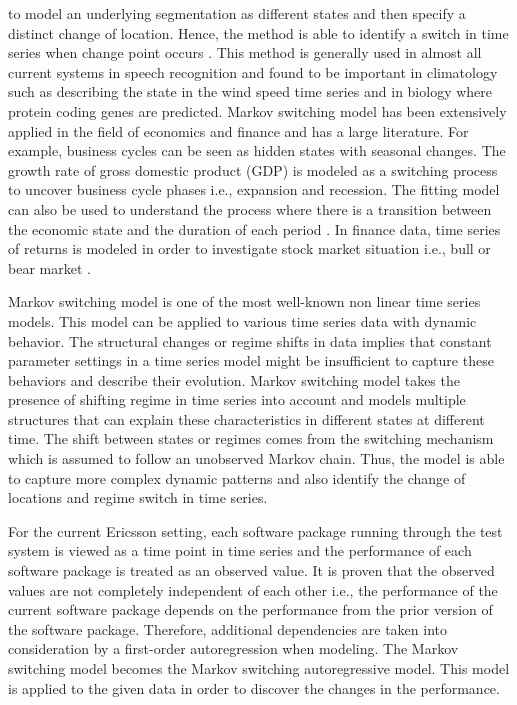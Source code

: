to model an underlying segmentation as different states and then specify
a distinct change of location. Hence, the method is able to identify
a switch in time series when change point occurs \citep{luong2012hidden}.
This method is generally used in almost all current systems in speech
recognition \citep{rabiner1989tutorial} and found to be important
in climatology such as describing the state in the wind speed time
series \citep{ailliot2012markov} and in biology \citep{stanke2003gene}
where protein coding genes are predicted. Markov switching model has
been extensively applied in the field of economics and finance and
has a large literature. For example, business cycles can be seen as
hidden states with seasonal changes. The growth rate of gross domestic
product (GDP) is modeled as a switching process to uncover business
cycle phases i.e., expansion and recession. The fitting model can
also be used to understand the process where there is a transition
between the economic state and the duration of each period \citep{hamilton1989new}.
In finance data, time series of returns is modeled in order to investigate
stock market situation i.e., bull or bear market \citep{kim1998testing}. 

Markov switching model is one of the most well-known non linear time
series models. This model can be applied to various time series data
with dynamic behavior. The structural changes or regime shifts in
data implies that constant parameter settings in a time series model
might be insufficient to capture these behaviors and describe their
evolution. Markov switching model takes the presence of shifting regime
in time series into account and models multiple structures that can
explain these characteristics in different states at different time.
The shift between states or regimes comes from the switching mechanism
which is assumed to follow an unobserved Markov chain. Thus, the model
is able to capture more complex dynamic patterns and also identify
the change of locations and regime switch in time series. 

For the current Ericsson setting, each software package running through
the test system is viewed as a time point in time series and the performance
of each software package is treated as an observed value. It is proven
that the observed values are not completely independent of each other
i.e., the performance of the current software package depends on the
performance from the prior version of the software package. Therefore,
additional dependencies are taken into consideration by a first-order
autoregression when modeling. The Markov switching model becomes the
Markov switching autoregressive model. This model is applied to the
given data in order to discover the changes in the performance.

